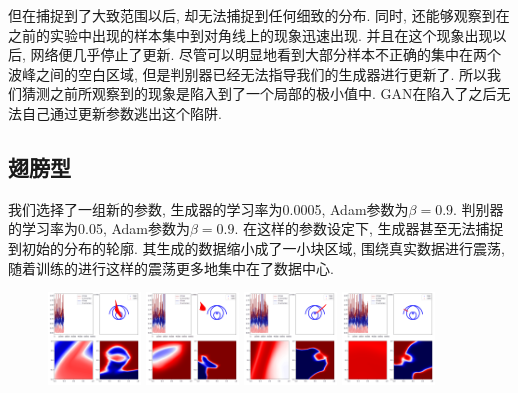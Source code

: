 \documentclass[lang=cn,11pt]{elegantpaper}
\begin{document}
但在捕捉到了大致范围以后, 却无法捕捉到任何细致的分布. 同时, 还能够观察到在之前的实验中出现的样本集中到对角线上的现象迅速出现. 并且在这个现象出现以后, 网络便几乎停止了更新. 尽管可以明显地看到大部分样本不正确的集中在两个波峰之间的空白区域, 但是判别器已经无法指导我们的生成器进行更新了. 所以我们猜测之前所观察到的现象是陷入到了一个局部的极小值中. GAN在陷入了之后无法自己通过更新参数逃出这个陷阱. 

\subsection{翅膀型}

我们选择了一组新的参数, 生成器的学习率为0.0005, Adam参数为$\beta=0.9$. 判别器的学习率为0.05, Adam参数为$\beta=0.9$. 在这样的参数设定下, 生成器甚至无法捕捉到初始的分布的轮廓. 其生成的数据缩小成了一小块区域, 围绕真实数据进行震荡, 随着训练的进行这样的震荡更多地集中在了数据中心.

\begin{figure}[hbt]
\centering
  \includegraphics[width=0.22\textwidth]{wings_4_1}
  \includegraphics[width=0.22\textwidth]{wings_4_2}
  \includegraphics[width=0.22\textwidth]{wings_4_3}
  \includegraphics[width=0.22\textwidth]{wings_4_4}
\end{figure}


\newpage
\nocite{*}



\end{document}
